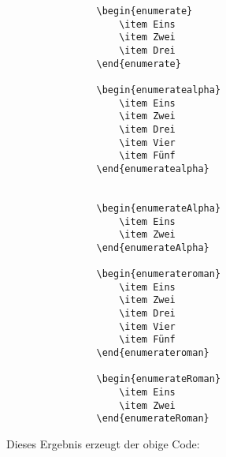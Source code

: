 			\begin{verbatim}
				\begin{enumerate}
					\item Eins
					\item Zwei
					\item Drei
				\end{enumerate}
				
				\begin{enumeratealpha}
					\item Eins
					\item Zwei
					\item Drei
					\item Vier
					\item Fünf
				\end{enumeratealpha}
				
				
				\begin{enumerateAlpha}
					\item Eins
					\item Zwei
				\end{enumerateAlpha}
				
				\begin{enumerateroman}
					\item Eins
					\item Zwei
					\item Drei
					\item Vier
					\item Fünf
				\end{enumerateroman}
				
				\begin{enumerateRoman}
					\item Eins
					\item Zwei
				\end{enumerateRoman}
			\end{verbatim}\newline
			
			Dieses Ergebnis erzeugt der obige Code: \newline
			
